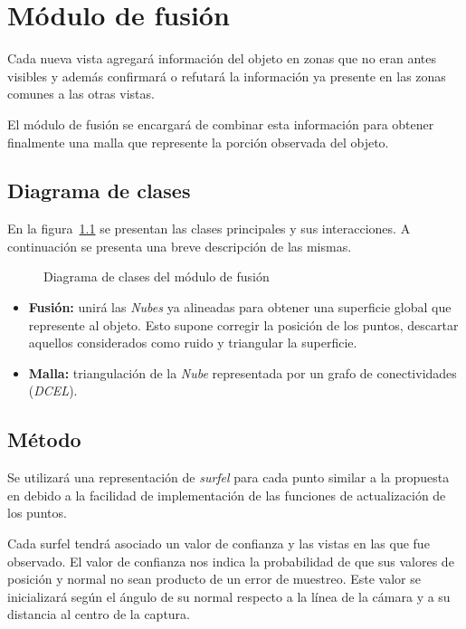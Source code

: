 \chapter{Módulo de fusión}
	Cada nueva vista agregará información del objeto en zonas que no eran antes visibles
	y además confirmará o refutará la información ya presente en las zonas comunes a las otras vistas.

	El módulo de fusión se encargará de combinar esta información para obtener
	finalmente una malla que represente la porción observada del objeto.

	\section{Diagrama de clases}
		En la figura~\ref{fig:fusion_class} se presentan las clases principales y sus interacciones.
		A continuación se presenta una breve descripción de las mismas.
		\begin{figure}
			\caption{\label{fig:fusion_class}Diagrama de clases del módulo de fusión}
		\end{figure}

		\begin{itemize}
			\item {\bfseries Fusión:} unirá las \emph{Nubes} ya alineadas para
				obtener una superficie global que represente al objeto.
				Esto supone corregir la posición de los puntos, descartar
				aquellos considerados como ruido y triangular la superficie.
			\item {\bfseries Malla:} triangulación de la \emph{Nube} representada por un grafo de conectividades (\emph{DCEL}).
		\end{itemize}


	\section{Método}
	Se utilizará una representación de \emph{surfel} para cada punto similar a la propuesta en \cite{5457479} %
	debido a la facilidad de implementación de las funciones de actualización de los puntos.

	Cada surfel tendrá asociado un valor de confianza y las vistas en las que
	fue observado.  El valor de confianza nos indica la probabilidad de que sus
	valores de posición y normal no sean producto de un error de muestreo.
	Este valor se inicializará según el ángulo de su normal respecto a la línea
	de la cámara y a su distancia al centro de la captura.


